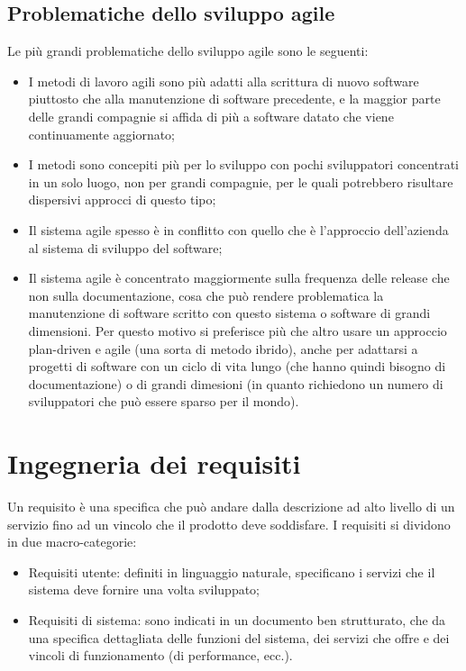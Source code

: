 \documentclass[a4paper, 10pt]{article}
\begin{document}
	\subsection{Problematiche dello sviluppo agile}
		Le più grandi problematiche dello sviluppo agile sono le seguenti:
		\begin{itemize}
			\item I metodi di lavoro agili sono più adatti alla scrittura di nuovo software piuttosto che alla manutenzione di software precedente, e la maggior parte delle grandi compagnie si affida di più a software datato che viene continuamente aggiornato;
			
			\item I metodi sono concepiti più per lo sviluppo con pochi sviluppatori concentrati in un solo luogo, non per grandi compagnie, per le quali potrebbero risultare dispersivi approcci di questo tipo;
			
			\item Il sistema agile spesso è in conflitto con quello che è l'approccio dell'azienda al sistema di sviluppo del software;
			
			\item Il sistema agile è concentrato maggiormente sulla frequenza delle release che non sulla documentazione, cosa che può rendere problematica la manutenzione di software scritto con questo sistema o software di grandi dimensioni. Per questo motivo si preferisce più che altro usare un approccio plan-driven e agile (una sorta di metodo ibrido), anche per adattarsi a progetti di software con un ciclo di vita lungo (che hanno quindi bisogno di documentazione) o di grandi dimesioni (in quanto richiedono un numero di sviluppatori che può essere sparso per il mondo).
		\end{itemize}
		
	\section{Ingegneria dei requisiti}
	Un requisito è una specifica che può andare dalla descrizione ad alto livello di un servizio fino ad un vincolo che il prodotto deve soddisfare.
	I requisiti si dividono in due macro-categorie:
	\begin{itemize}
		\item Requisiti utente: definiti in linguaggio naturale, specificano i servizi che il sistema deve fornire una volta sviluppato;
		
		\item Requisiti di sistema: sono indicati in un documento ben strutturato, che da una specifica dettagliata delle funzioni del sistema, dei servizi che offre e dei vincoli di funzionamento (di performance, ecc.).
	\end{itemize}
\end{document}
